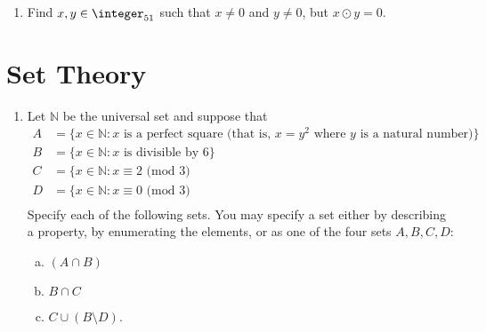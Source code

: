 \begin{enumerate}

\item
Find $x,y \in \integer_{51}$ such that $x \neq 0$ and $y \neq 0$, but $x \odot y = 0$.


\end{enumerate}


\section{Set Theory}

\begin{enumerate}

\item
Let ${\mathbb N}$ be the universal set and suppose that
\begin{align*}
A &= \{ x \in {\mathbb N} : x \text{ is a perfect square (that is, } x=y^2 \text{ where } y \text{ is a natural number)}\} \\ 
B &= \{ x \in {\mathbb N} : x \text{ is divisible by 6}\} \\ 
C &= \{ x \in {\mathbb N} : x  \equiv 2 \text{ (mod 3)} \\
D &= \{ x \in {\mathbb N} : x  \equiv 0 \text{ (mod 3)} \\
\end{align*} 
Specify each of the following sets. You may specify a set either by describing a property, by enumerating the elements, or as one of the four sets $A, B, C, D$:
\begin{enumerate}[(a)]
\item
$(A \cap B)$
\item
$B \cap C$
\item
$C \cup (B \setminus D)$.
\end{enumerate}





\end{enumerate}
